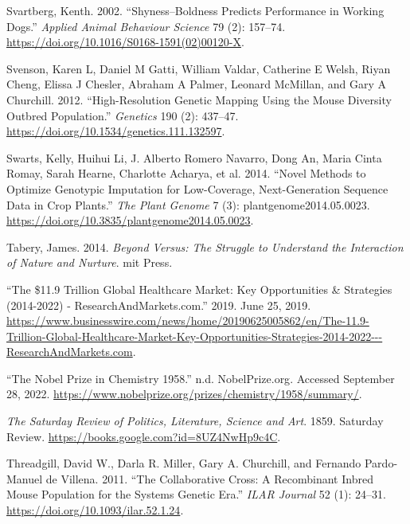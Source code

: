 \documentclass[
]{book}
\newlength{\cslhangindent}
\newlength{\cslentryspacingunit} %
\newenvironment{CSLReferences}[2] %
 {%
  \setlength{\parindent}{0pt}
  \ifodd #1
  \let\oldpar\par
  \def\par{\hangindent=\cslhangindent\oldpar}
  \fi
  \setlength{\parskip}{#2\cslentryspacingunit}
 }%
 {}
\begin{document}
\begin{CSLReferences}{1}{0}
\leavevmode{}%
Svartberg, Kenth. 2002. {``Shyness--Boldness Predicts Performance in Working Dogs.''} \emph{Applied Animal Behaviour Science} 79 (2): 157--74. \url{https://doi.org/10.1016/S0168-1591(02)00120-X}.

\leavevmode{}%
Svenson, Karen L, Daniel M Gatti, William Valdar, Catherine E Welsh, Riyan Cheng, Elissa J Chesler, Abraham A Palmer, Leonard McMillan, and Gary A Churchill. 2012. {``High-{Resolution Genetic Mapping Using} the {Mouse Diversity Outbred Population}.''} \emph{Genetics} 190 (2): 437--47. \url{https://doi.org/10.1534/genetics.111.132597}.

\leavevmode{}%
Swarts, Kelly, Huihui Li, J. Alberto Romero Navarro, Dong An, Maria Cinta Romay, Sarah Hearne, Charlotte Acharya, et al. 2014. {``Novel {Methods} to {Optimize Genotypic Imputation} for {Low-Coverage}, {Next-Generation Sequence Data} in {Crop Plants}.''} \emph{The Plant Genome} 7 (3): plantgenome2014.05.0023. \url{https://doi.org/10.3835/plantgenome2014.05.0023}.

\leavevmode{}%
Tabery, James. 2014. \emph{Beyond Versus: {The} Struggle to Understand the Interaction of Nature and Nurture}. {mit Press}.

\leavevmode{}%
{``The \$11.9 {Trillion Global Healthcare Market}: {Key Opportunities} \& {Strategies} (2014-2022) - {ResearchAndMarkets}.com.''} 2019. June 25, 2019. \url{https://www.businesswire.com/news/home/20190625005862/en/The-11.9-Trillion-Global-Healthcare-Market-Key-Opportunities-Strategies-2014-2022---ResearchAndMarkets.com}.

\leavevmode{}%
{``The {Nobel Prize} in {Chemistry} 1958.''} n.d. {NobelPrize.org}. Accessed September 28, 2022. \url{https://www.nobelprize.org/prizes/chemistry/1958/summary/}.

\leavevmode{}%
\emph{The {Saturday Review} of {Politics}, {Literature}, {Science} and {Art}}. 1859. {Saturday Review}. \url{https://books.google.com?id=8UZ4NwHp9c4C}.

\leavevmode{}%
Threadgill, David W., Darla R. Miller, Gary A. Churchill, and Fernando Pardo-Manuel de Villena. 2011. {``The {Collaborative Cross}: {A Recombinant Inbred Mouse Population} for the {Systems Genetic Era}.''} \emph{ILAR Journal} 52 (1): 24--31. \url{https://doi.org/10.1093/ilar.52.1.24}.


\end{CSLReferences}
\end{document}
